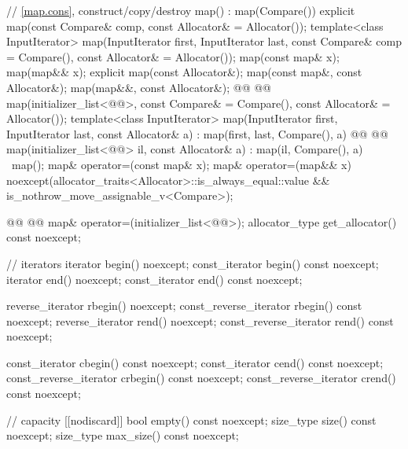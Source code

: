\documentclass{wg21}
\begin{document}
\begin{codeblock}
{{        // \ref{map.cons}, construct/copy/destroy
        map() : map(Compare()) { }
        explicit map(const Compare& comp, const Allocator& = Allocator());
        template<class InputIterator>
        map(InputIterator first, InputIterator last,
        const Compare& comp = Compare(), const Allocator& = Allocator());
        map(const map& x);
        map(map&& x);
        explicit map(const Allocator&);
        map(const map&, const Allocator&);
        map(map&&, const Allocator&);
        @@
        @@
        map(initializer_list<@@>, const Compare& = Compare(), const Allocator& = Allocator());
        template<class InputIterator>
        map(InputIterator first, InputIterator last, const Allocator& a)
        : map(first, last, Compare(), a) { }
        @@
        @@
        map(initializer_list<@@> il, const Allocator& a)
        : map(il, Compare(), a) { }
        ~map();
        map& operator=(const map& x);
        map& operator=(map&& x)
        noexcept(allocator_traits<Allocator>::is_always_equal::value &&
        is_nothrow_move_assignable_v<Compare>);

        @@
        @@
        map& operator=(initializer_list<@@>);
        allocator_type get_allocator() const noexcept;

        // iterators
        iterator               begin() noexcept;
        const_iterator         begin() const noexcept;
        iterator               end() noexcept;
        const_iterator         end() const noexcept;

        reverse_iterator       rbegin() noexcept;
        const_reverse_iterator rbegin() const noexcept;
        reverse_iterator       rend() noexcept;
        const_reverse_iterator rend() const noexcept;

        const_iterator         cbegin() const noexcept;
        const_iterator         cend() const noexcept;
        const_reverse_iterator crbegin() const noexcept;
        const_reverse_iterator crend() const noexcept;

        // capacity
        [[nodiscard]] bool empty() const noexcept;
        size_type size() const noexcept;
        size_type max_size() const noexcept;

}}
\end{codeblock}
\end{document}
